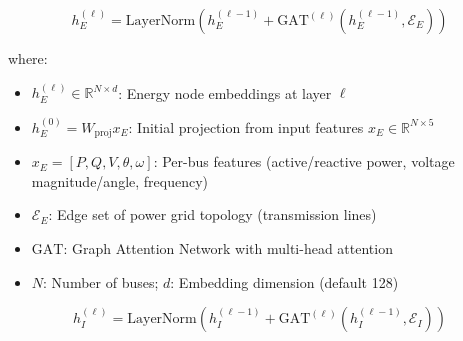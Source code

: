 

\begin{equation}
\label{eq:energy_gnn}
h_E^{(\ell)} = \text{LayerNorm}\left( h_E^{(\ell-1)} + \text{GAT}^{(\ell)}\left(h_E^{(\ell-1)}, \mathcal{E}_E\right) \right)
\end{equation}

\noindent where:
\begin{itemize}
    \item $h_E^{(\ell)} \in \mathbb{R}^{N \times d}$: Energy node embeddings at layer $\ell$
    \item $h_E^{(0)} = W_{\text{proj}} x_E$: Initial projection from input features $x_E \in \mathbb{R}^{N \times 5}$
    \item $x_E = [P, Q, V, \theta, \omega]$: Per-bus features (active/reactive power, voltage magnitude/angle, frequency)
    \item $\mathcal{E}_E$: Edge set of power grid topology (transmission lines)
    \item $\text{GAT}$: Graph Attention Network with multi-head attention
    \item $N$: Number of buses; $d$: Embedding dimension (default 128)
\end{itemize}


\begin{equation}
\label{eq:comm_gnn}
h_I^{(\ell)} = \text{LayerNorm}\left( h_I^{(\ell-1)} + \text{GAT}^{(\ell)}\left(h_I^{(\ell-1)}, \mathcal{E}_I\right) \right)
\end{equation}

